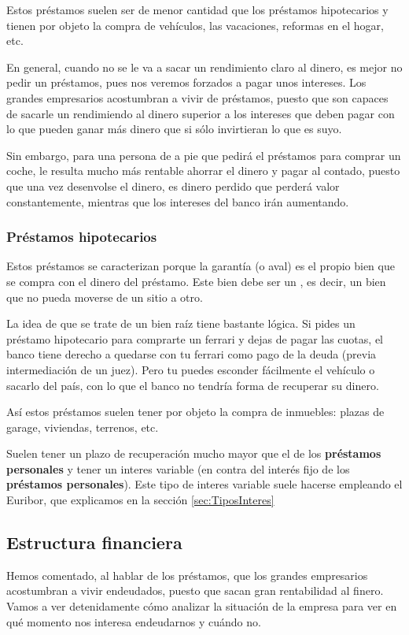 \documentclass[nochap,palatino,shortheader]{apuntes}
\begin{document}
Estos préstamos suelen ser de menor cantidad que los préstamos hipotecarios y tienen por objeto la compra de vehículos, las vacaciones, reformas en el hogar, etc.

En general, cuando no se le va a sacar un rendimiento claro al dinero, es mejor no pedir un préstamos, pues nos veremos forzados a pagar unos intereses. Los grandes empresarios acostumbran a vivir de préstamos, puesto que son capaces de sacarle un rendimiendo al dinero superior a los intereses que deben pagar con lo que pueden ganar más dinero que si sólo invirtieran lo que es suyo.

Sin embargo, para una persona de a pie que pedirá el préstamos para comprar un coche, le resulta mucho más rentable ahorrar el dinero y pagar al contado, puesto que una vez desenvolse el dinero, es dinero perdido que perderá valor constantemente, mientras que los intereses del banco irán aumentando.

\subsubsection{Préstamos hipotecarios}
Estos préstamos se caracterizan porque la garantía (o aval) es el propio bien que se compra con el dinero del préstamo. Este bien debe ser un , es decir, un bien que no pueda moverse de un sitio a otro.

La idea de que se trate de un bien raíz tiene bastante lógica. Si pides un préstamo hipotecario para comprarte un ferrari y dejas de pagar las cuotas, el banco tiene derecho a quedarse con tu ferrari como pago de la deuda (previa intermediación de un juez). Pero tu puedes esconder fácilmente el vehículo o sacarlo del país, con lo que el banco no tendría forma de recuperar su dinero.

Así estos préstamos suelen tener por objeto la compra de inmuebles: plazas de garage, viviendas, terrenos, etc.

Suelen tener un plazo de recuperación mucho mayor que el de los \textbf{préstamos personales} y tener un interes variable (en contra del interés fijo de los \textbf{préstamos personales}). Este tipo de interes variable suele hacerse empleando el Euribor, que explicamos en la sección \ref{sec:TiposInteres}


\subsection{Estructura financiera}
Hemos comentado, al hablar de los préstamos, que los grandes empresarios acostumbran a vivir endeudados, puesto que sacan gran rentabilidad al finero. Vamos a ver detenidamente cómo analizar la situación de la empresa para ver en qué momento nos interesa endeudarnos y cuándo no.
\end{document}
